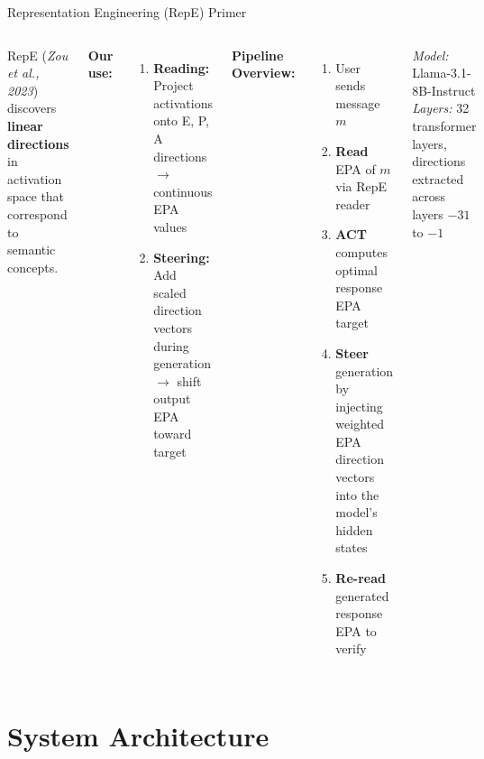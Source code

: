 \documentclass[aspectratio=169,11pt]{beamer}
\begin{document}
\begin{frame}{Representation Engineering (RepE) Primer}
\begin{columns}[T]
RepE (\textit{Zou et al., 2023}) discovers \textbf{linear directions}
in activation space that correspond to semantic concepts.

\bigskip

\textbf{Our use:}
\begin{enumerate}
    \item \textbf{Reading:} Project activations onto E, P, A directions
          $\rightarrow$ continuous EPA values
    \item \textbf{Steering:} Add scaled direction vectors during generation
          $\rightarrow$ shift output EPA toward target
\end{enumerate}

\textbf{Pipeline Overview:}

\begin{enumerate}
    \item User sends message $m$
    \item \textbf{Read} EPA of $m$ via RepE reader
    \item \textbf{ACT} computes optimal response EPA target
    \item \textbf{Steer} generation by injecting weighted EPA direction
          vectors into the model's hidden states
    \item \textbf{Re-read} generated response EPA to verify
\end{enumerate}

\bigskip

\textit{Model:} Llama-3.1-8B-Instruct\\
\textit{Layers:} 32 transformer layers, directions extracted across
layers $-31$ to $-1$
\end{columns}
\end{frame}

\section{System Architecture}
\end{document}
